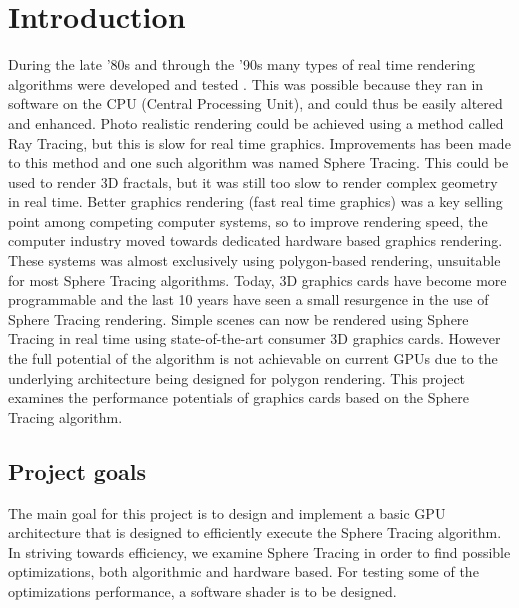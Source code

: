 \chapter{Introduction} 	

	During the late '80s and through the '90s many types of real time rendering
	algorithms were developed and tested \cite{Hart1989}. This was possible
	because they ran in software on the	CPU (Central Processing Unit), and
	could thus be easily altered and enhanced. Photo realistic rendering could
	be achieved using a method called Ray Tracing, but this is slow for real time
	graphics\cite{Shirley2005}. Improvements has been made to this method and one
	such algorithm was named Sphere Tracing. This could be used to render 3D
	fractals\cite{Hart1989}, but it was	still too slow to render complex
	geometry in real time\cite{Hart1989}. Better graphics rendering (fast real
	time graphics) was a key selling point among competing computer systems, so
	to improve rendering speed, the computer industry moved towards dedicated
	hardware based graphics rendering\cite{Houston2010}. These systems was
	almost exclusively using polygon-based	rendering, unsuitable for most
	Sphere Tracing algorithms. Today, 3D graphics cards have become more
	programmable and the last 10 years have seen a small resurgence in the use
	of Sphere Tracing rendering\cite{Quilez2008}. Simple scenes can now be
	rendered using Sphere Tracing in real time using state-of-the-art consumer
	3D graphics cards. However the full potential of the algorithm is not
	achievable on current GPUs due to the underlying architecture being
	designed for polygon rendering\cite{Houston2010}. This project examines the
	performance	potentials of graphics cards based on the Sphere Tracing 
	algorithm.


	\section{Project goals}
	
		The main goal for this project is to design and implement a basic GPU 
		architecture that is designed to efficiently execute the Sphere Tracing 
		algorithm. In striving towards efficiency, we examine Sphere Tracing in 
		order to find possible optimizations, both algorithmic and hardware 
		based. For testing some of the optimizations performance, a software shader is 
                to be designed.
		
